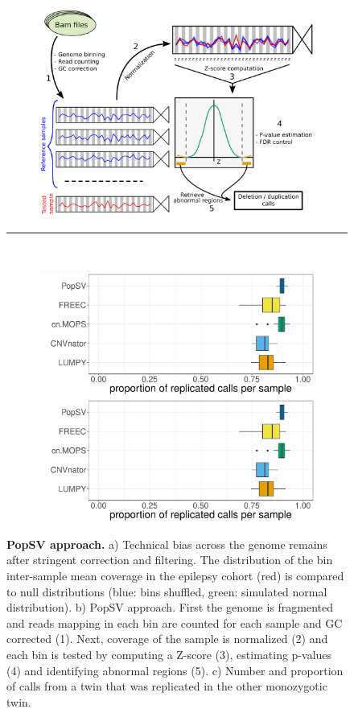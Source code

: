 \begin{figure}[!h]
\begin{subfigure}[b]{.7\linewidth}
    \includegraphics[width=\linewidth]{figures/PopSVworkflow.png}
    \caption{}
    \label{fig:popsv}
  \end{subfigure}
  \unskip \hrule\
  \medskip

  \begin{subfigure}[b]{\linewidth}
    \includegraphics[width=.5\linewidth, page=2]{figures/twin-benchmark-long.pdf}
    \includegraphics[width=.5\linewidth, page=1]{figures/twin-benchmark-long.pdf}
    \caption{}
    \label{fig:twinconc}
  \end{subfigure}
  \caption[{\sf PopSV} approach]{{\bf {\sf PopSV} approach. } {\small a) Technical bias across the genome remains after stringent correction and filtering. The distribution of the bin inter-sample mean coverage in the epilepsy cohort (red) is compared to null distributions (blue: bins shuffled, green: simulated normal distribution). b) {\sf PopSV} approach. First the genome is fragmented and reads mapping in each bin are counted for each sample and GC corrected (1). Next, coverage of the sample is normalized (2) and each bin is tested by computing a Z-score (3), estimating p-values (4) and identifying abnormal regions (5). c) Number and proportion of calls from a twin that was replicated in the other monozygotic twin.}}
\end{figure}


